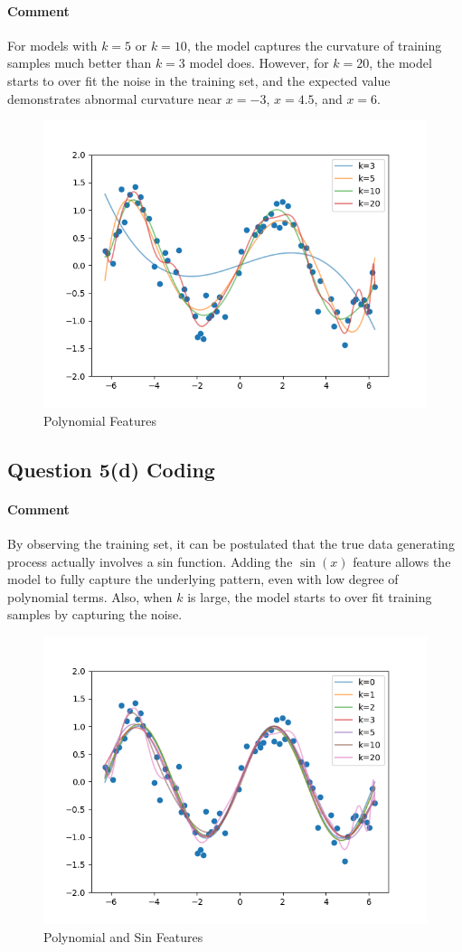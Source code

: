 \documentclass[11pt]{article}
\begin{document}
	\paragraph{Comment} For models with $k=5$ or $k=10$, the model captures the curvature of training samples much better than $k=3$ model does. However, for $k=20$, the model starts to over fit the noise in the training set, and the expected value demonstrates abnormal curvature near $x=-3$, $x=4.5$, and $x=6$.
	\begin{figure}[h]
		\centering
		\includegraphics[width=0.6\linewidth]{src/featuremaps/5c.png}
		\caption{Polynomial Features}
	\end{figure}
	
	\newpage
	\subsection{Question 5(d) Coding}
	\paragraph{Comment} By observing the training set, it can be postulated that the true data generating process actually involves a sin function. Adding the $\sin(x)$ feature allows the model to fully capture the underlying pattern, even with low degree of polynomial terms. Also, when $k$ is large, the model starts to over fit training samples by capturing the noise.
	\begin{figure}[h]
		\centering
		\includegraphics[width=0.6\linewidth]{src/featuremaps/5d.png}
		\caption{Polynomial and Sin Features}
	\end{figure}
	
\end{document}
